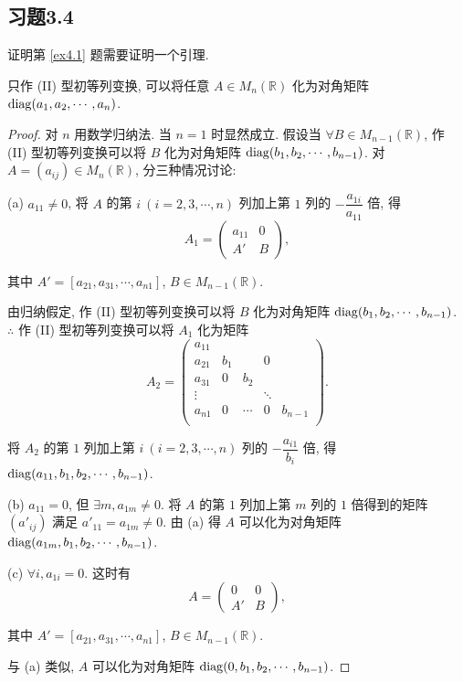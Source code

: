 \documentclass{ctexart}
\begin{document}
\subsection{习题3.4}
证明第 \ref{ex4.1} 题需要证明一个引理.
\begin{lemma}\label{l5.2}
    只作 (II) 型初等列变换, 可以将任意 $A\in M_n(\mathbb{R})$ 化为对角矩阵 $\operatorname{diag}(a_1,a_2,\cdots,a_n)$.
\end{lemma}
\begin{proof}
    对 $n$ 用数学归纳法. 当 $n=1$ 时显然成立. 假设当 $\forall B\in M_{n-1}(\mathbb{R})$, 作 (II) 型初等列变换可以将 $B$ 化为对角矩阵 $\operatorname{diag}(b_1,b_2,\cdots,b_{n-1})$. 对 $A=(a_{ij})\in M_n(\mathbb{R})$, 分三种情况讨论:

    (a) $a_{11}\neq0$, 将 $A$ 的第 $i\ (i=2,3,\cdots,n)$ 列加上第 $1$ 列的 $-\dfrac{a_{1i}}{a_{11}}$ 倍, 得
    \[A_1=\begin{pmatrix}
        a_{11} & 0 \\
        A' & B
    \end{pmatrix},\]

    其中 $A'=[a_{21},a_{31},\cdots,a_{n1}]$, $B\in M_{n-1}(\mathbb{R})$.
    
    由归纳假定, 作 (II) 型初等列变换可以将 $B$ 化为对角矩阵 $\operatorname{diag}(b_1,b_2,\cdots,b_{n-1})$. $\therefore$ 作 (II) 型初等列变换可以将 $A_1$ 化为矩阵
    \[A_2=\begin{pmatrix}
        a_{11} \\
        a_{21} & b_1 && 0 \\
        a_{31} & 0 & b_2 \\
        \vdots &&& \ddots \\
        a_{n1} & 0 & \cdots & 0 & b_{n-1} \\
    \end{pmatrix}.\]

    将 $A_2$ 的第 $1$ 列加上第 $i\ (i=2,3,\cdots,n)$ 列的 $-\dfrac{a_{i1}}{b_i}$ 倍, 得 $\operatorname{diag}(a_{11},b_1,b_2,\cdots,b_{n-1})$.

    (b) $a_{11}=0$, 但 $\exists m,a_{1m}\neq0$. 将 $A$ 的第 $1$ 列加上第 $m$ 列的 $1$ 倍得到的矩阵 $(a'_{ij})$ 满足 $a'_{11}=a_{1m}\neq0$. 由 (a) 得 $A$ 可以化为对角矩阵 $\operatorname{diag}(a_{1m},b_1,b_2,\cdots,b_{n-1})$.

    (c) $\forall i,a_{1i}=0$. 这时有
    \[A=\begin{pmatrix}
        0 & 0 \\
        A' & B
    \end{pmatrix},\]

    其中 $A'=[a_{21},a_{31},\cdots,a_{n1}]$, $B\in M_{n-1}(\mathbb{R})$.
    
    与 (a) 类似, $A$ 可以化为对角矩阵 $\operatorname{diag}(0,b_1,b_2,\cdots,b_{n-1})$.
\end{proof}
\end{document}
